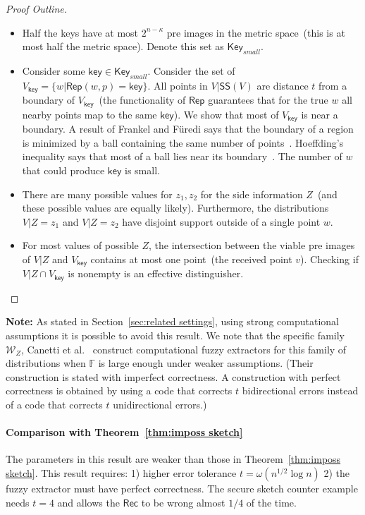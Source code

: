 \documentclass[11pt]{article}
\newcommand{\secref}[1]{\mbox{Section~\ref{#1}}}
\newcommand{\thref}[1]{\mbox{Theorem~\ref{#1}}}
\newcommand{\class}[1]{{\ensuremath{\mathsf{#1}}}}
\newcommand{\key}{\ensuremath{\class{key}}\xspace}
\newcommand{\Key}{\ensuremath{\class{Key}}\xspace}
\newcommand{\rep}{\ensuremath{\class{Rep}}\xspace}
\newcommand{\sketch}{\ensuremath{\class{SS}}\xspace}
\newcommand{\rec}{\ensuremath{\class{Rec}}\xspace}
\begin{document}
\begin{proof}[Proof Outline]
\begin{itemize}
\begin{itemize}
\item Half the keys have at most $2^{n- \kappa}$ pre images in the metric space~(this is at most half the metric space).  Denote this set as $\Key_{small}$.  
\item Consider some $\key \in \Key_{small}$.  %
Consider the set of $V_{\key } = \{w | \rep(w, p) = \key \}$.  All points in $V | \sketch(V)$ are distance $t$ from a boundary of $V_\key$~(the functionality of $\rep$ guarantees that for the true $w$ all nearby points map to the same $\key$).  We show that most of $V_\key$ is near a boundary.  A result of Frankel and F{\"u}redi says that the boundary of a region is minimized by a ball containing the same number of points~\cite{frankl1981short}.  Hoeffding's inequality says that most of a ball lies near its boundary~\cite{hoeffding1963probability}.  The number of $w$ that could produce $\key$ is small.
\item There are many possible values for $z_1, z_2$ for the side information $Z$~(and these possible values are equally likely).  Furthermore, the distributions $V|Z=z_1 $ and $V| Z=z_2$ have disjoint support outside of a single point $w$.
\item For most values of possible $Z$, the intersection between the viable pre images of $V|Z$ and $V_\key$ contains at most one point~(the received point $v$).  Checking if $V|Z \cap V_{\key}$ is nonempty is an effective distinguisher.
\end{itemize}
\end{itemize}

\end{proof}

\noindent
\textbf{Note:} As stated in \secref{sec:related settings}, using strong computational assumptions it is possible to avoid this result.  We note that the specific family $\mathcal{W}_Z$, Canetti et al.~\cite[Construction 5.3]{canetti2014key} construct computational fuzzy extractors  for this family of distributions when $\mathbb{F}$ is large enough under weaker assumptions.  (Their construction is stated with imperfect correctness.  A construction with perfect correctness is obtained by using a code that corrects $t$ bidirectional errors instead of a code that corrects $t$ unidirectional errors.)

\paragraph{Comparison with \thref{thm:imposs sketch}} The parameters in this result are weaker than those in \thref{thm:imposs sketch}.  This result requires: 1) higher error tolerance $t= \omega(n^{1/2}\log n)$ 2) the fuzzy extractor must have perfect correctness.  The secure sketch counter example needs $t=4$ and allows the $\rec$ to be wrong almost $1/4$ of the time.
\end{document}
